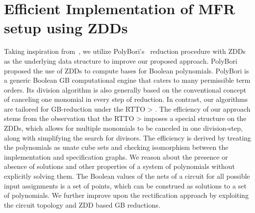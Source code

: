 \section{Efficient Implementation of MFR setup using ZDDs}\label{impl}



Taking inspiration from~\cite{Utkarsh:TCAD19}, we utilize 
PolyBori’s~\cite{pbori:JSC09} reduction procedure with 
ZDDs~\cite{Minato:DAC93,Minato:DAC94} as the underlying data structure 
to improve our proposed approach.
PolyBori proposed the use of ZDDs to compute
\Grobner bases for Boolean polynomials. PolyBori is a generic Boolean GB computational
engine that caters to many permissible term orders. Its division algorithm is also generally
based on the conventional concept of canceling one monomial in every step of reduction.
In contrast, our algorithms are tailored for GB-reduction under the RTTO > . The efficiency
of our approach stems from the observation that the RTTO > imposes a special structure
on the ZDDs, which allows for multiple monomials to be canceled in one division-step,
along with simplifying the search for divisors.
The efficiency is derived by treating the polynomials 
as unate cube sets and checking isomorphism between the implementation and specification 
graphs. We reason about the presence or absence of solutions and other properties of a 
system of polynomials without explicitly solving them. 
The Boolean values of the nets of a circuit for all possible input assignments is a set 
of points, which can be construed as solutions to a set of polynomials.
We further improve upon the rectification approach by exploiting the circuit 
topology and ZDD based GB reductions.